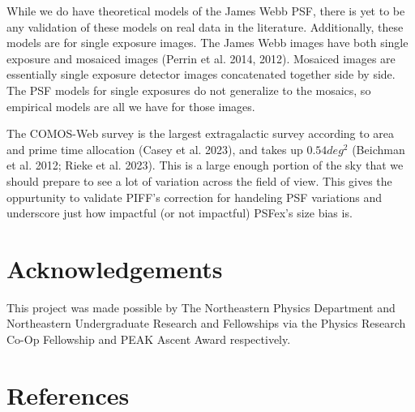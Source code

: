 \documentclass[10pt,a4paper,onecolumn]{article}
\let\textttOrig=\texttt
\def\texttt#1{\expandafter\textttOrig{\seqsplit{#1}}}
\let\addcontentslineOrig=\addcontentsline
\def\addcontentsline#1#2#3{\bgroup
  \let\texttt=\textttOrig\addcontentslineOrig{#1}{#2}{#3}\egroup}
\begin{document}
While we do have theoretical models of the James Webb PSF, there is yet
to be any validation of these models on real data in the literature.
Additionally, these models are for single exposure images. The James
Webb images have both single exposure and mosaiced images (Perrin et al.
2014, 2012). Mosaiced images are essentially single exposure detector
images concatenated together side by side. The PSF models for single
exposures do not generalize to the mosaics, so empirical models are all
we have for those images.

The COMOS-Web survey is the largest extragalactic survey according to
area and prime time allocation (Casey et al. 2023), and takes up
\(0.54 deg^2\) (Beichman et al. 2012; Rieke et al. 2023). This is a
large enough portion of the sky that we should prepare to see a lot of
variation across the field of view. This gives \texttt{ShOpt} the
oppurtunity to validate PIFF's correction for handeling PSF variations
and underscore just how impactful (or not impactful) PSFex's size bias
is.

\hypertarget{acknowledgements}{%
\section{Acknowledgements}\label{acknowledgements}}

This project was made possible by The Northeastern Physics Department
and Northeastern Undergraduate Research and Fellowships via the Physics
Research Co-Op Fellowship and PEAK Ascent Award respectively.

\hypertarget{references}{%
\section*{References}\label{references}}
\end{document}
